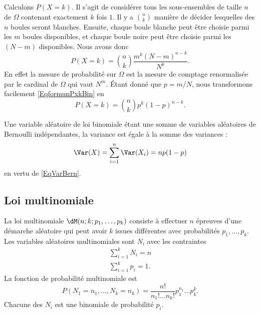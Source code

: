 Calculons \( P(X=k)\). Il s'agit de considérer tous les sous-ensembles de taille \( n\) de \( \Omega\) contenant exactement \( k\) fois \( 1\). Il y a \( {n\choose k}\) manière de décider lesquelles des \( n\) boules seront blanches. Ensuite, chaque boule blanche peut être choisie parmi les \( m\) boules disponibles, et chaque boule noire peut être choisie parmi les  \( (N-m)\) disponibles. Nous avons donc
\begin{equation}        \label{EqformunPxkBin}
    P(X=k)={n\choose k}\frac{ m^k(N-m)^{n-k} }{ N^k }.
\end{equation}
En effet la mesure de probabilité sur \( \Omega\) est la mesure de comptage renormalisée par le cardinal de \( \Omega\) qui vaut \( N^m\). Étant donné que \( p=m/N\), nous transformons facilement \eqref{EqformunPxkBin} en
\begin{equation}
    P(X=k)={n\choose k}p^k(1-p)^{n-k}.
\end{equation}

Une variable aléatoire de loi binomiale étant une somme de variables aléatoires de Bernoulli indépendantes, la variance est égale à la somme des variances :
\begin{equation}    \label{EqKLubWlh}
    \Var(X)=\sum_{i=1}^n\Var(X_i)=np(1-p)
\end{equation}
en vertu de \eqref{EqVarBern}.

\subsection{Loi multinomiale}

La loi multinomiale \( \dM(n;k;p_1,\ldots, p_k)\) consiste à effectuer \( n\) épreuves d'une démarche aléatoire qui peut avoir \( k\) issues différentes avec probabilités \( p_1,\ldots, p_k\). Les variables aléatoires multinomiales sont \( N_i\) avec les contraintes
\begin{subequations}
    \begin{align}
        \sum_{i=1}^kN_i=n\\
        \sum_{i=1}^kp_i=1.
    \end{align}
\end{subequations}
La fonction de probabilité multinomiale est
\begin{equation}
    P(N_1=n_1,\ldots, N_k=n_k)=\frac{ n! }{ n_1!\ldots n_k! }p_1^{n_1}\ldots p_k^k.
\end{equation}
Chacune des \( N_i\) est une binomiale de probabilité \( p_i\).

